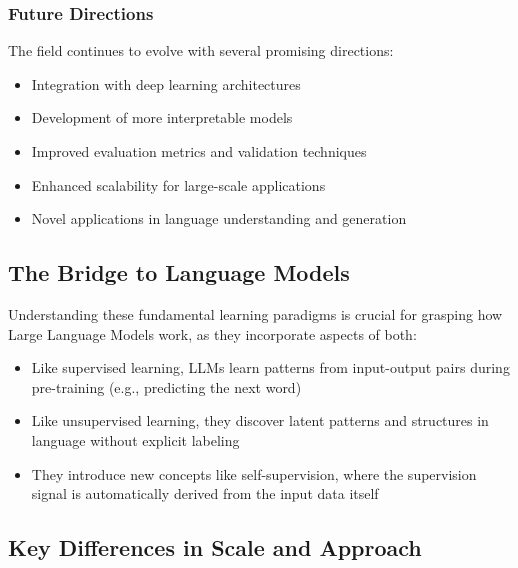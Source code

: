 \subsubsection{Future Directions}
\noindent
The field continues to evolve with several promising directions:

\begin{itemize}[noitemsep]
    \item Integration with deep learning architectures
    \item Development of more interpretable models
    \item Improved evaluation metrics and validation techniques
    \item Enhanced scalability for large-scale applications
    \item Novel applications in language understanding and generation
\end{itemize}

\subsection{The Bridge to Language Models}

Understanding these fundamental learning paradigms is crucial for grasping how Large Language Models work, as they incorporate aspects of both:

\begin{itemize}[noitemsep]
    \item Like supervised learning, LLMs learn patterns from input-output pairs during pre-training (e.g., predicting the next word)
    \item Like unsupervised learning, they discover latent patterns and structures in language without explicit labeling
    \item They introduce new concepts like self-supervision, where the supervision signal is automatically derived from the input data itself
\end{itemize}

\subsection{Key Differences in Scale and Approach}

